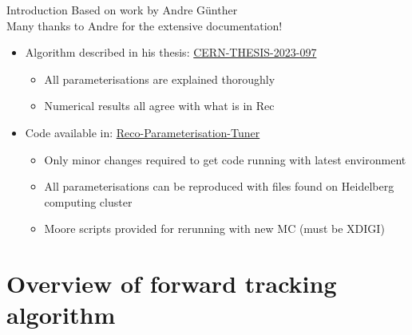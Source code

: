 \documentclass[xcolor={dvipsnames}]{beamer}
\begin{document}
\begin{frame}{Introduction}
  \vspace{0.0cm}
  {\Large Based on work by Andre G{\"u}nther\\}
  {\large Many thanks to Andre for the extensive documentation!}
  \vspace{0.5cm}
  \begin{itemize}
    \setlength\itemsep{1.0em}
    \item{Algorithm described in his thesis: \href{https://cds.cern.ch/record/2865000?ln=en}{CERN-THESIS-2023-097}}
    \begin{itemize}
      \item{All parameterisations are explained thoroughly}
      \item{Numerical results all agree with what is in Rec}
    \end{itemize}
    \item{Code available in: \href{https://gitlab.cern.ch/gunther/prforwardtracking-parametrisation-tuner}{Reco-Parameterisation-Tuner}}
    \begin{itemize}
      \item{Only minor changes required to get code running with latest environment}
      \item{All parameterisations can be reproduced with files found on Heidelberg computing cluster}
      \item{Moore scripts provided for rerunning with new MC (must be XDIGI)}
    \end{itemize}
  \end{itemize}
\end{frame}

\section{Overview of forward tracking algorithm}
\end{document}
